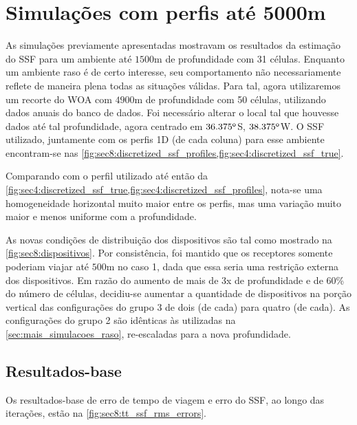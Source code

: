 
\clearpage

\section{Simulações com perfis até 5000m}
\label{sec:mais_simulacoes_profundo}

As simulações previamente apresentadas mostravam os resultados da estimação do SSF para um ambiente até $1500\si{\meter}$ de profundidade com 31 células. Enquanto um ambiente raso é de certo interesse, seu comportamento não necessariamente reflete de maneira plena todas as situações válidas. Para tal, agora utilizaremos um recorte do WOA com $4900\si{\meter}$ de profundidade com 50 células, utilizando dados anuais do banco de dados. Foi necessário alterar o local tal que houvesse dados até tal profundidade, agora centrado em $36.375^{{\textsf{o}}}$S, $38.375^{{\textsf{o}}}$W. O SSF utilizado, juntamente com os perfis 1D (de cada coluna) para esse ambiente encontram-se nas \cref{fig:sec8:discretized_ssf_profiles,fig:sec4:discretized_ssf_true}.

Comparando com o perfil utilizado até então da \cref{fig:sec4:discretized_ssf_true,fig:sec4:discretized_ssf_profiles}, nota-se uma homogeneidade horizontal muito maior entre os perfis, mas uma variação muito maior e menos uniforme com a profundidade.



As novas condições de distribuição dos dispositivos são tal como mostrado na \cref{fig:sec8:dispositivos}. Por consistência, foi mantido que os receptores somente poderiam viajar até $500\si{\meter}$ no caso 1, dada que essa seria uma restrição externa dos dispositivos. Em razão do aumento de mais de 3x de profundidade e de 60\% do número de células, decidiu-se aumentar a quantidade de dispositivos na porção vertical das configurações do grupo 3 de dois (de cada) para quatro (de cada). As configurações do grupo 2 são idênticas às utilizadas na \cref{sec:mais_simulacoes_raso}, re-escaladas para a nova profundidade.


\subsection{Resultados-base}

Os resultados-base de erro de tempo de viagem e erro do SSF, ao longo das iterações, estão na \cref{fig:sec8:tt_ssf_rms_errors}.

